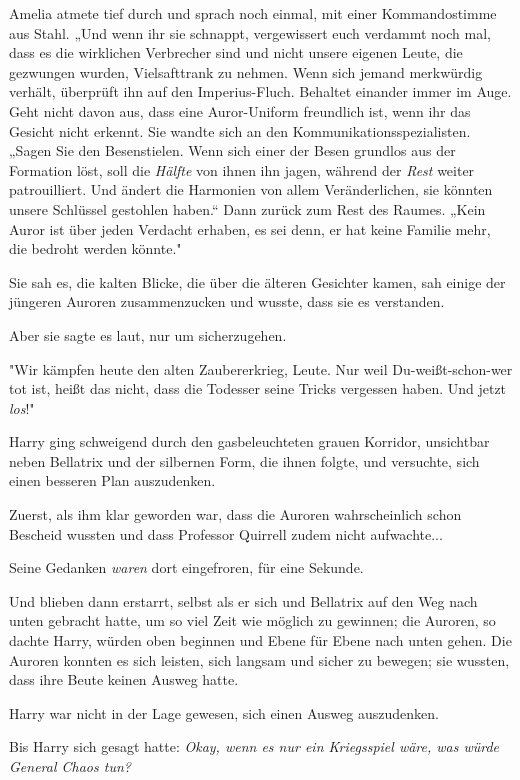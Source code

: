 {Amelia atmete tief durch und sprach noch einmal, mit einer Kommandostimme aus Stahl. „Und wenn ihr sie schnappt, vergewissert euch verdammt noch mal, dass es die wirklichen Verbrecher sind und nicht unsere eigenen Leute, die gezwungen wurden, Vielsafttrank zu nehmen. Wenn sich jemand merkwürdig verhält, überprüft ihn auf den Imperius-Fluch. Behaltet einander immer im Auge. Geht nicht davon aus, dass eine Auror-Uniform freundlich ist, wenn ihr das Gesicht nicht erkennt. Sie wandte sich an den Kommunikationsspezialisten. „Sagen Sie den Besenstielen. Wenn sich einer der Besen grundlos aus der Formation löst, soll die \emph{Hälfte} von ihnen ihn jagen, während der \emph{Rest} weiter patrouilliert. Und ändert die Harmonien von allem Veränderlichen, sie könnten unsere Schlüssel gestohlen haben.“ Dann zurück zum Rest des Raumes. „Kein Auror ist über jeden Verdacht erhaben, es sei denn, er hat keine Familie mehr, die bedroht werden könnte."

Sie sah es, die kalten Blicke, die über die älteren Gesichter kamen, sah einige der jüngeren Auroren zusammenzucken und wusste, dass sie es verstanden.

Aber sie sagte es laut, nur um sicherzugehen.

"Wir kämpfen heute den alten Zaubererkrieg, Leute. Nur weil Du-weißt-schon-wer tot ist, heißt das nicht, dass die Todesser seine Tricks vergessen haben. Und jetzt \emph{los}!"

Harry ging schweigend durch den gasbeleuchteten grauen Korridor, unsichtbar neben Bellatrix und der silbernen Form, die ihnen folgte, und versuchte, sich einen besseren Plan auszudenken.

Zuerst, als ihm klar geworden war, dass die Auroren wahrscheinlich schon Bescheid wussten und dass Professor Quirrell zudem nicht aufwachte...

Seine Gedanken \emph{waren} dort eingefroren, für eine Sekunde.

Und blieben dann erstarrt, selbst als er sich und Bellatrix auf den Weg nach unten gebracht hatte, um so viel Zeit wie möglich zu gewinnen; die Auroren, so dachte Harry, würden oben beginnen und Ebene für Ebene nach unten gehen. Die Auroren konnten es sich leisten, sich langsam und sicher zu bewegen; sie wussten, dass ihre Beute keinen Ausweg hatte.

Harry war nicht in der Lage gewesen, sich einen Ausweg auszudenken.

Bis Harry sich gesagt hatte: \emph{Okay, wenn es nur ein Kriegsspiel wäre, was würde General Chaos tun?}

}
